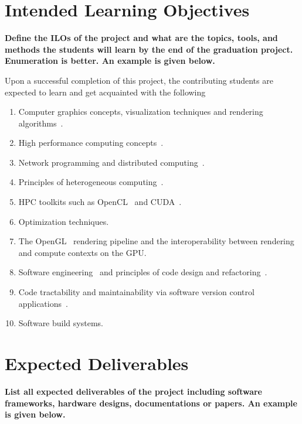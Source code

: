 \documentclass[12pt]{article} 				%
\begin{document}
\section{Intended Learning Objectives} \label{section:objectives}
\textbf{Define the ILOs of the project and what are the topics, tools, and methods the students will learn by the end of the graduation project. Enumeration is better. An example is given below.}

\vspace*{1cm}

Upon a successful completion of this project, the contributing students are expected to learn and get acquainted with the following 
\begin{enumerate}
\item Computer graphics concepts, visualization techniques and rendering algorithms~\cite{volume-rendering}. 
\item High performance computing concepts~\cite{what-is-hpc}.  
\item Network programming and distributed computing~\cite{client-server-model}.
\item Principles of heterogeneous computing~\cite{heterogeneous-computing}.
\item \acs{HPC} toolkits such as \acs{OpenCL}~\cite{opencl} and \acs{CUDA}~\cite{cuda}.
\item Optimization techniques. 
\item The \acs{OpenGL}~\cite{opengl} rendering pipeline and the interoperability between rendering and compute contexts on the \acs{GPU}.
\item Software engineering~\cite{software-engineering} and principles of code design and refactoring~\cite{refactoring}.
\item Code tractability and maintainability via software version control applications~\cite{version-control}. 
\item Software build systems\cite{software-build}. 
\end{enumerate} 
  
\section{Expected Deliverables} \label{section:expected-deliverables}

\textbf{List all expected deliverables of the project including software frameworks, hardware designs, documentations or papers. An example is given below.}
\end{document}
